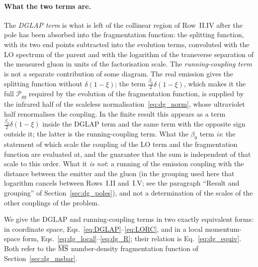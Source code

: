 \paragraph{What the two terms are.} The \emph{DGLAP term} is what is left of the collinear region of Row~II.IV after the pole has been absorbed into the fragmentation function: the splitting function, with its two end points subtracted into the evolution terms, convoluted with the LO spectrum of the parent and with the logarithm of the transverse separation of the measured gluon in units of the factorisation scale. The \emph{running-coupling term} is not a separate contribution of some diagram. The real emission gives the splitting function without $\delta(1-\xi)$; the term $\frac{\beta_0}{2}\delta(1-\xi)$, which makes it the full $\mathcal P_{gg}$ required by the evolution of the fragmentation function, is supplied by the infrared half of the scaleless normalisation~\eqref{eq:dg_norm}, whose ultraviolet half renormalises the coupling. In the finite result this appears as a term $\frac{\beta_0}{2}\delta(1-\xi)$ inside the DGLAP term and the same term with the opposite sign outside it; the latter is the running-coupling term. What the $\beta_0$ term \emph{is}: the statement of which scale the coupling of the LO term and the fragmentation function are evaluated at, and the guarantee that the sum is independent of that scale to this order. What it \emph{is not}: a running of the emission coupling with the distance between the emitter and the gluon (in the grouping used here that logarithm cancels between Rows~I.II and~I.V; see the paragraph ``Result and grouping'' of Section~\ref{sec:dg_poles}), and not a determination of the scales of the other couplings of the problem.

We give the DGLAP and running-coupling terms in two exactly equivalent forms: in coordinate space, Eqs.~\eqref{eq:DGLAP}--\eqref{eq:LORC}, and in a local momentum-space form, Eqs.~\eqref{eq:dg_local}--\eqref{eq:dg_R}; their relation is Eq.~\eqref{eq:dg_equiv}. Both refer to the $\overline{\rm MS}$ number-density fragmentation function of Section~\ref{sec:dg_msbar}.

